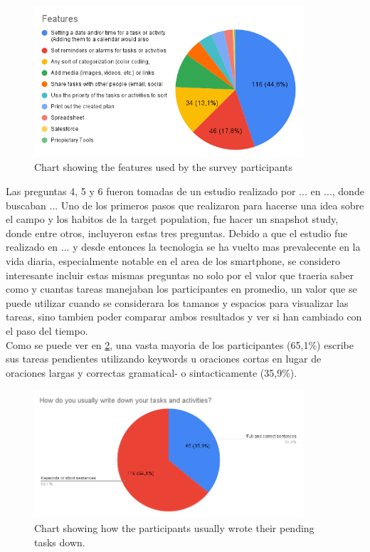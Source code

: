 \FloatBarrier
\begin{figure}[!htbp]
    \centering
    \includegraphics[width=10cm]{Images/General/03_user_centered_design/Survey/Features.png}
    \caption{Chart showing the features used by the survey participants}
    \label{fig:surveyFeatures}
\end{figure}
\FloatBarrier

Las preguntas 4, 5 y 6 fueron tomadas de un estudio realizado por ... en ..., donde buscaban ... Uno de los primeros pasos que realizaron para hacerse una idea sobre el campo y los habitos de la target population, fue hacer un snapshot study, donde entre otros, incluyeron estas tres preguntas. Debido a que el estudio fue realizado en ... y desde entonces la tecnologia se ha vuelto mas prevalecente en la vida diaria, especialmente notable en el area de los smartphone, se considero interesante incluir estas mismas preguntas no solo por el valor que traeria saber como y cuantas tareas manejaban los participantes en promedio, un valor que se puede utilizar cuando se considerara los tamanos y espacios para visualizar las tareas, sino tambien poder comparar ambos resultados y ver si han cambiado con el paso del tiempo.\\ Como se puede ver en \ref{fig:surveyWriteDown}, una vasta mayoria de los participantes (65,1\%) escribe sus tareas pendientes utilizando keywords u oraciones cortas en lugar de oraciones largas y correctas gramatical- o sintacticamente (35,9\%). 

\FloatBarrier
\begin{figure}[!htbp]
    \centering
    \includegraphics[width=10cm]{Images/General/03_user_centered_design/Survey/WriteDown.png}
    \caption{Chart showing how the participants usually wrote their pending tasks down.}
    \label{fig:surveyWriteDown}
\end{figure}
\FloatBarrier

